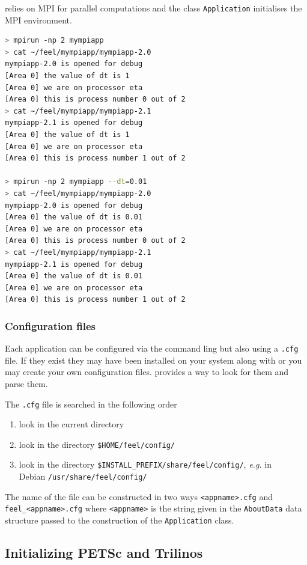 \feel relies on MPI for parallel computations and the class
\lstinline!Application!  initialises the MPI environment.

\begin{lstlisting}[language=sh]
> mpirun -np 2 mympiapp
> cat ~/feel/mympiapp/mympiapp-2.0
mympiapp-2.0 is opened for debug
[Area 0] the value of dt is 1
[Area 0] we are on processor eta
[Area 0] this is process number 0 out of 2
> cat ~/feel/mympiapp/mympiapp-2.1
mympiapp-2.1 is opened for debug
[Area 0] the value of dt is 1
[Area 0] we are on processor eta
[Area 0] this is process number 1 out of 2

> mpirun -np 2 mympiapp --dt=0.01
> cat ~/feel/mympiapp/mympiapp-2.0
mympiapp-2.0 is opened for debug
[Area 0] the value of dt is 0.01
[Area 0] we are on processor eta
[Area 0] this is process number 0 out of 2
> cat ~/feel/mympiapp/mympiapp-2.1
mympiapp-2.1 is opened for debug
[Area 0] the value of dt is 0.01
[Area 0] we are on processor eta
[Area 0] this is process number 1 out of 2
\end{lstlisting}

\subsubsection{Configuration files}


Each application can be configured via the command ling but also using a
\verb|.cfg| file. If they exist they may have been installed on your system
along with \feel or you may create your own configuration files.  \feel provides
a way to look for them and parse them.

The \verb|.cfg| file is searched in the following order
\begin{enumerate}
\item look in the current directory
\item look in the directory \verb|$HOME/feel/config/|
\item look in the directory \verb|$INSTALL_PREFIX/share/feel/config/|,
  \emph{e.g.} in\\ Debian \verb|/usr/share/feel/config/|
\end{enumerate}
The name of the file can be constructed in two ways \verb|<appname>.cfg| and
\verb|feel_<appname>.cfg| where \verb|<appname>| is the string given in the
\verb|AboutData| data structure passed to the construction of the
\verb|Application| class.


\subsection{Initializing PETSc and Trilinos}

